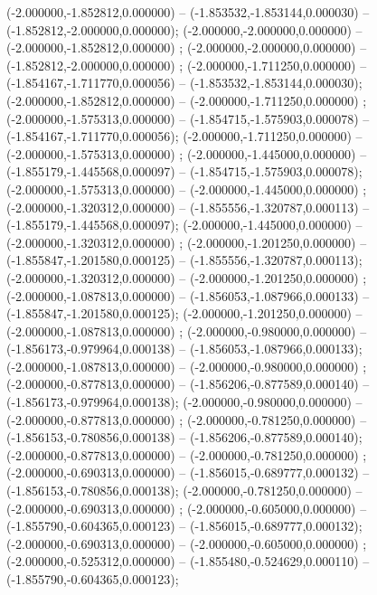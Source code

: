  (-2.000000,-1.852812,0.000000) -- (-1.853532,-1.853144,0.000030) -- (-1.852812,-2.000000,0.000000);
 (-2.000000,-2.000000,0.000000) -- (-2.000000,-1.852812,0.000000) ;
 (-2.000000,-2.000000,0.000000) -- (-1.852812,-2.000000,0.000000) ;
 (-2.000000,-1.711250,0.000000) -- (-1.854167,-1.711770,0.000056) -- (-1.853532,-1.853144,0.000030);
 (-2.000000,-1.852812,0.000000) -- (-2.000000,-1.711250,0.000000) ;
 (-2.000000,-1.575313,0.000000) -- (-1.854715,-1.575903,0.000078) -- (-1.854167,-1.711770,0.000056);
 (-2.000000,-1.711250,0.000000) -- (-2.000000,-1.575313,0.000000) ;
 (-2.000000,-1.445000,0.000000) -- (-1.855179,-1.445568,0.000097) -- (-1.854715,-1.575903,0.000078);
 (-2.000000,-1.575313,0.000000) -- (-2.000000,-1.445000,0.000000) ;
 (-2.000000,-1.320312,0.000000) -- (-1.855556,-1.320787,0.000113) -- (-1.855179,-1.445568,0.000097);
 (-2.000000,-1.445000,0.000000) -- (-2.000000,-1.320312,0.000000) ;
 (-2.000000,-1.201250,0.000000) -- (-1.855847,-1.201580,0.000125) -- (-1.855556,-1.320787,0.000113);
 (-2.000000,-1.320312,0.000000) -- (-2.000000,-1.201250,0.000000) ;
 (-2.000000,-1.087813,0.000000) -- (-1.856053,-1.087966,0.000133) -- (-1.855847,-1.201580,0.000125);
 (-2.000000,-1.201250,0.000000) -- (-2.000000,-1.087813,0.000000) ;
 (-2.000000,-0.980000,0.000000) -- (-1.856173,-0.979964,0.000138) -- (-1.856053,-1.087966,0.000133);
 (-2.000000,-1.087813,0.000000) -- (-2.000000,-0.980000,0.000000) ;
 (-2.000000,-0.877813,0.000000) -- (-1.856206,-0.877589,0.000140) -- (-1.856173,-0.979964,0.000138);
 (-2.000000,-0.980000,0.000000) -- (-2.000000,-0.877813,0.000000) ;
 (-2.000000,-0.781250,0.000000) -- (-1.856153,-0.780856,0.000138) -- (-1.856206,-0.877589,0.000140);
 (-2.000000,-0.877813,0.000000) -- (-2.000000,-0.781250,0.000000) ;
 (-2.000000,-0.690313,0.000000) -- (-1.856015,-0.689777,0.000132) -- (-1.856153,-0.780856,0.000138);
 (-2.000000,-0.781250,0.000000) -- (-2.000000,-0.690313,0.000000) ;
 (-2.000000,-0.605000,0.000000) -- (-1.855790,-0.604365,0.000123) -- (-1.856015,-0.689777,0.000132);
 (-2.000000,-0.690313,0.000000) -- (-2.000000,-0.605000,0.000000) ;
 (-2.000000,-0.525312,0.000000) -- (-1.855480,-0.524629,0.000110) -- (-1.855790,-0.604365,0.000123);
